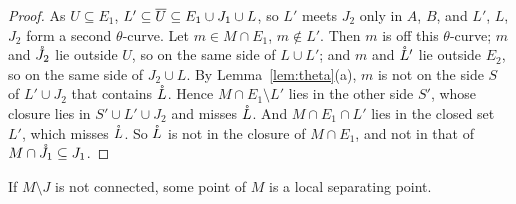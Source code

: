 \begin{proof}
As $U\subseteq E_1$, $L'\subseteq\overline{U}\subseteq E_1\cup J_1\cup L$, so $L'$ meets $J_2$ only in $A$, $B$, and $L'$, $L$, $J_2$ form a second $\theta$-curve. Let $m\in M\cap E_1$, $m\notin L'$. Then $m$ is off this
$\theta$-curve; $m$ and $\mathring{J}_2$ lie outside $U$, so on the same side of $L\cup L'$; and $m$ and $\mathring{L}'$ lie outside $E_2$, so on the same side of $J_2\cup L$. By Lemma~\ref{lem:theta}(a), $m$ is not on the side
$S$ of $L'\cup J_2$ that contains $\mathring{L}$. Hence $M\cap E_1\setminus L'$ lies in the other side $S'$, whose closure lies in $S'\cup L'\cup J_2$ and misses $\mathring{L}$. And $M\cap E_1\cap L'$ lies in the closed set $L'$, which
misses $\mathring{L}$. So $\mathring{L}$ is not in the closure of $M\cap E_1$, and not in that of $M\cap\mathring{J}_1\subseteq J_1$.
\end{proof}


\begin{proposition}[Case 2]\label{prop:case2}
If $M\setminus J$ is not connected, some point of $M$ is a local separating point.
\end{proposition}

